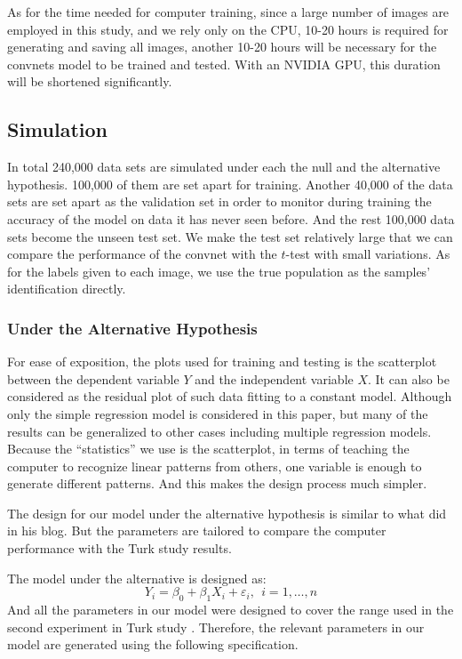 \documentclass[12pt]{article}
\begin{document}
As for the time needed for computer training, since a large number of
images are employed in this study, and we rely only on the CPU, 10-20
hours is required for generating and saving all images, another 10-20
hours will be necessary for the convnets model to be trained and tested.
With an NVIDIA GPU, this duration will be shortened significantly.

\subsection{Simulation}\label{simulation}

In total 240,000 data sets are simulated under each the null and the
alternative hypothesis. 100,000 of them are set apart for training.
Another 40,000 of the data sets are set apart as the validation set in
order to monitor during training the accuracy of the model on data it
has never seen before. And the rest 100,000 data sets become the unseen
test set. We make the test set relatively large that we can compare the
performance of the convnet with the \(t\)-test with small variations. As
for the labels given to each image, we use the true population as the
samples' identification directly.

\subsubsection{Under the Alternative
Hypothesis}\label{under-the-alternative-hypothesis}

For ease of exposition, the plots used for training and testing is the
scatterplot between the dependent variable \(Y\) and the independent
variable \(X\). It can also be considered as the residual plot of such
data fitting to a constant model. Although only the simple regression
model is considered in this paper, but many of the results can be
generalized to other cases including multiple regression models. Because
the ``statistics'' we use is the scatterplot, in terms of teaching the
computer to recognize linear patterns from others, one variable is
enough to generate different patterns. And this makes the design process
much simpler.

The design for our model under the alternative hypothesis is similar to
what \citet{SIM18} did in his blog. But the parameters are tailored to
compare the computer performance with the Turk study results.

The model under the alternative is designed as:
\[Y_i = \beta_0 + \beta_1 X_{i}  + \varepsilon_i, ~~i=1, \dots , n\] And
all the parameters in our model were designed to cover the range used in
the second experiment in Turk study \citep{MM13}. Therefore, the
relevant parameters in our model are generated using the following
specification.
\end{document}
